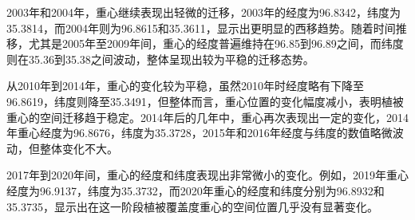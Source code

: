 \documentclass{article}
\begin{document}
		2003年和2004年，重心继续表现出轻微的迁移，2003年的经度为96.8342，纬度为35.3814，而2004年则为96.8615和35.3611，显示出更明显的西移趋势。随着时间推移，尤其是2005年至2009年间，重心的经度普遍维持在96.85到96.89之间，而纬度则在35.36到35.38之间波动，整体呈现出较为平稳的迁移态势。
		
		从2010年到2014年，重心的变化较为平稳，虽然2010年时经度略有下降至96.8619，纬度则降至35.3491，但整体而言，重心位置的变化幅度减小，表明植被重心的空间迁移趋于稳定。2014年后的几年中，重心再次表现出一定的变化，2014年重心经度为96.8676，纬度为35.3728，2015年和2016年经度与纬度的数值略微波动，但整体变化不大。
		
		2017年到2020年间，重心的经度和纬度表现出非常微小的变化。例如，2019年重心经度为96.9137，纬度为35.3732，而2020年重心的经度和纬度分别为96.8932和35.3735，显示出在这一阶段植被覆盖度重心的空间位置几乎没有显著变化。
		
\end{document}
